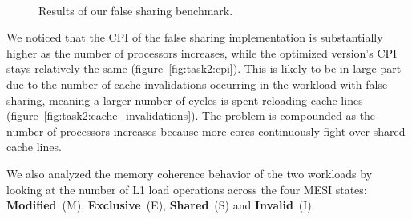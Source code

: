 \documentclass[10pt]{article}
\begin{document}
\begin{figure}[htbp]
    \centering
    \hfill
    \\
    \caption{Results of our false sharing benchmark.}
    \label{fig:task2:fig1}
\end{figure}

We noticed that the CPI of the false sharing implementation is substantially higher as the number of processors increases, while the optimized version's CPI stays relatively the same (figure~\ref{fig:task2:cpi}). This is likely to be in large part due to the number of cache invalidations occurring in the workload with false sharing, meaning a larger number of cycles is spent reloading cache lines (figure~\ref{fig:task2:cache_invalidations}). The problem is compounded as the number of processors increases because more cores continuously fight over shared cache lines.

We also analyzed the memory coherence behavior of the two workloads by looking at the number of L1 load operations across the four MESI states: \textbf{Modified}~(M), \textbf{Exclusive}~(E), \textbf{Shared}~(S) and \textbf{Invalid}~(I).
\end{document}

